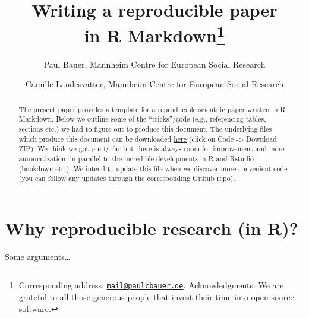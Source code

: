 \documentclass[
  12pt,
]{article}
\title{\hfill\break
\hfill\break
\vspace{1cm}Writing a reproducible paper\\
in R Markdown\footnote{Corresponding address:
  \href{mailto:mail@paulcbauer.de}{\nolinkurl{mail@paulcbauer.de}}.
  Acknowledgments: We are grateful to all those generous people that
  invest their time into open-source software.}\vspace{0.5cm}\\}
\author{Paul Bauer, Mannheim Centre for European Social
Research \and Camille Landesvatter, Mannheim Centre for European Social
Research}
\date{\hfill\break
First version: December 14, 2018\\
This version: June 19, 2023\\
Download: \url{https://osf.io/q395s}\\
\strut \\
Feedback? Errors?
\href{mailto:mail@paulcbauer.de}{\nolinkurl{mail@paulcbauer.de}}\\
\href{https://github.com/paulcbauer/Writing_a_reproducable_paper_in_rmarkdown/}{Github
repository}\\
\strut \\
Tired of Latex?\\
Try \href{https://github.com/rstudio/pagedown}{Pagedown} with our
\href{https://osf.io/k8jhx/}{new template}! :-)}
\begin{document}
\maketitle
\begin{abstract}
\noindent{}The present paper provides a template for a
reproducible scientific paper written in R Markdown. Below we outline
some of the ``tricks''/code (e.g., referencing tables, sections etc.) we
had to figure out to produce this document. The underlying files which
produce this document can be downloaded
\href{https://github.com/paulcbauer/Writing_a_reproducable_paper_in_rmarkdown}{here}
(click on Code -\textgreater{} Download ZIP). We think we got pretty far
but there is always room for improvement and more automatization, in
parallel to the incredible developments in R and Rstudio (bookdown
etc.). We intend to update this file when we discover more convenient
code (you can follow any updates through the corresponding
\href{https://github.com/paulcbauer/Writing_a_reproducable_paper_in_rmarkdown/}{Github
repo}).\vspace{.8cm}
\end{abstract}

\clearpage

\renewcommand{\baselinestretch}{0.5}\normalsize
\tableofcontents
\renewcommand{\baselinestretch}{1.1}\normalsize

\clearpage

\hypertarget{why-reproducible-research-in-r}{%
\section{Why reproducible research (in
R)?}\label{why-reproducible-research-in-r}}

Some arguments\ldots{}
\end{document}
